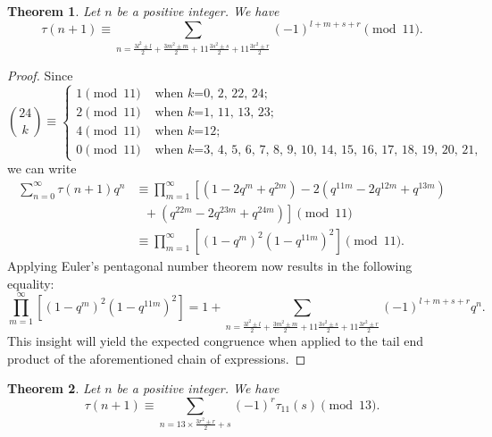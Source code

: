\documentclass[10pt]{article}
\newtheorem{theorem}{Theorem}[section]
\theoremstyle{definition}
\begin{document}
\begin{theorem}
Let $n$ be a positive integer. We have
\begin{equation}
\tau(n+1)\equiv\sum_{n=\frac{3l^2\pm l}{2}+\frac{3m^2\pm m}{2}+11\frac{3s^2\pm s}{2}+11\frac{3r^2\pm r}{2}}(-1)^{l+m+s+r}\pmod{11}.
\end{equation}
\end{theorem}
\begin{proof}
Since 
\[{24\choose{k}}\equiv\begin{cases}
1\pmod{11}&\text{ when $k$=0, 2, 22, 24;}\\
2\pmod{11}&\text{ when $k$=1, 11, 13, 23;}\\
4\pmod{11}&\text{ when $k$=12;}\\
0\pmod{11}&\text{ when $k$=3, 4, 5, 6, 7, 8, 9, 10, 14, 15, 16, 17, 18, 19, 20, 21,}
\end{cases}
\]
we can write
\begin{align*}
\sum_{n=0}^{\infty}\tau(n+1)q^n
&\equiv\prod_{m=1}^{\infty}\left[\left(1-2q^m+q^{2m}\right)-2\left(q^{11m}-2q^{12m}+q^{13m}\right)\right.\\
&\text{\ \ \ \ \ \ \ \ }+\left.\left(q^{22m}-2q^{23m}+q^{24m}\right)\right]\pmod{11}\\
&\equiv \prod_{m=1}^{\infty}\left[(1-q^m)^2(1-q^{11m})^2\right]\pmod{11}.
\end{align*}
Applying Euler's pentagonal number theorem now results in the following equality:
\[\prod_{m=1}^{\infty}\left[(1-q^m)^2(1-q^{11m})^2\right]=1+\sum_{n=\frac{3l^2\pm l}{2}+\frac{3m^2\pm m}{2}+11\frac{3s^2\pm s}{2}+11\frac{3r^2\pm r}{2}}(-1)^{l+m+s+r}q^n.
\]
This insight will yield the expected congruence when applied to the tail end product of the aforementioned chain of expressions. 
\end{proof}
\begin{theorem}
Let $n$ be a positive integer. We have
\begin{equation}
\tau(n+1)\equiv \sum_{n=13\times\frac{3r^2\pm r}{2}+s}(-1)^r\tau_{11}(s)\pmod{13}.
\end{equation}
\end{theorem}
\end{document}
